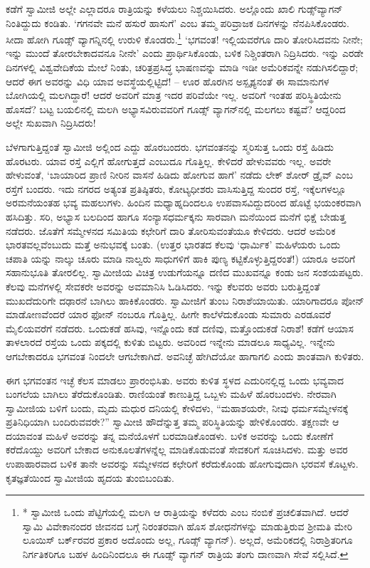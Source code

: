 ಕಡೆಗೆ ಸ್ವಾಮೀಜಿ ಅಲ್ಲೇ ಎಲ್ಲಾದರೂ ರಾತ್ರಿಯನ್ನು ಕಳೆಯಲು ನಿಶ್ಚಯಿಸಿದರು. ಅಲ್ಲೊಂದು ಖಾಲಿ ಗುಡ್ಸ್​ವ್ಯಾಗನ್ ನಿಂತಿದ್ದುದು ಕಂಡಿತು. ‘ಗಗನವೇ ಮನೆ ಹಸುರೆ ಹಾಸುಗೆ’ ಎಂಬ ತಮ್ಮ ಪರಿವ್ರಾಜಕ ದಿನಗಳನ್ನು ನೆನಪಿಸಿಕೊಂಡರು. ಸೀದಾ ಹೋಗಿ ಗೂಡ್ಸ್ ವ್ಯಾಗನ್ನಿನಲ್ಲಿ ಉರುಳಿ ಕೊಂಡರು.\footnote{* ಸ್ವಾಮೀಜಿ ಒಂದು ಪೆಟ್ಟಿಗೆಯಲ್ಲಿ ಮಲಗಿ ಆ ರಾತ್ರಿಯನ್ನು ಕಳೆದರು ಎಂಬ ನಂಬಿಕೆ ಪ್ರಚಲಿತವಾಗಿದೆ. ಆದರೆ ಸ್ವಾಮಿ ವಿವೇಕಾನಂದರ ಜೀವನದ ಬಗ್ಗೆ ನಿರಂತರವಾಗಿ ಹೊಸ ಶೋಧನೆಗಳನ್ನು ಮಾಡುತ್ತಿರುವ ಶ್ರೀಮತಿ ಮೇರಿ ಲೂಯಿಸ್ ಬರ್ಕ್​ರವರ ಪ್ರಕಾರ ಅದೊಂದು  ಅಲ್ಲ, ಗೂಡ್ಸ್ ವ್ಯಾಗನ್​). ಅಲ್ಲದೆ, ಅಮೆರಿಕದಲ್ಲಿ ನಿರಾಶ್ರಿತರಿಗೂ ನಿರ್ಗತಿಕರಿಗೂ ಬಹಳ ಹಿಂದಿನಿಂದಲೂ ಈ ಗೂಡ್ಸ್ ವ್ಯಾಗನ್ ರಾತ್ರಿಯ ತಂಗು ದಾಣವಾಗಿ ಸೇವೆ ಸಲ್ಲಿಸಿದೆ.} ‘ಭಗವಂತ! ಇಲ್ಲಿಯವರೆಗೂ ದಾರಿ ತೋರಿಸಿದವನು ನೀನೇ; ಇನ್ನು ಮುಂದೆ ತೋರಬೇಕಾದವನೂ ನೀನೇ’ ಎಂದು ಪ್ರಾರ್ಥಿಸಿಕೊಂಡು, ಬಳಿಕ ನಿಶ್ಚಿಂತರಾಗಿ ನಿದ್ರಿಸಿದರು. ಇನ್ನು ಎರಡೇ ದಿನಗಳಲ್ಲಿ ವಿಶ್ವವೇದಿಕೆಯ ಮೇಲೆ ನಿಂತು, ಚರಿತ್ರಪ್ರಸಿದ್ಧ ಭಾಷಣವನ್ನು ಮಾಡಿ ಇಡೀ ಅಮೆರಿಕವನ್ನೇ ನಡುಗಿಸಲಿದ್ದಾರೆ; ಆದರೆ ಈಗ ಅವರನ್ನು ವಿಧಿ ಯಾವ ಅವಸ್ಥೆಯಲ್ಲಿಟ್ಟಿದೆ! – ಊರ ಹೊರಗಿನ ಅಸ್ಪೃಶ್ಯನಂತೆ ಈ ಸಾಮಾನುಗಳ ಬೋಗಿಯಲ್ಲಿ ಮಲಗಿದ್ದಾರೆ! ಆದರೆ ಅವರಿಗೆ ಮಾತ್ರ ಇದರ ಪರಿವೆಯೇ ಇಲ್ಲ. ಅವರಿಗೆ ಇಂತಹ ಪರಿಸ್ಥಿತಿಯೇನು ಹೊಸದೆ? ಬಟ್ಟ ಬಯಲಿನಲ್ಲಿ ಮಲಗಿ ಅಭ್ಯಾಸವಿರುವವರಿಗೆ ಗೂಡ್ಸ್ ವ್ಯಾಗನ್​ನಲ್ಲಿ ಮಲಗಲು ಕಷ್ಟವೆ? ಆದ್ದರಿಂದ ಅಲ್ಲೇ ಸುಖವಾಗಿ ನಿದ್ರಿಸಿದರು!

ಬೆಳಗಾಗುತ್ತಿದ್ದಂತೆ ಸ್ವಾಮೀಜಿ ಅಲ್ಲಿಂದ ಎದ್ದು ಹೊರಬಂದರು. ಭಗವಂತನನ್ನು ಸ್ಮರಿಸುತ್ತ ಒಂದು ರಸ್ತೆ ಹಿಡಿದು ಹೊರಟರು. ಯಾವ ರಸ್ತೆ ಎಲ್ಲಿಗೆ ಹೋಗುತ್ತದೆ ಎಂಬುದೂ ಗೊತ್ತಿಲ್ಲ. ಕೇಳಿದರೆ ಹೇಳುವವರು ಇಲ್ಲ. ಅವರೇ ಹೇಳುವಂತೆ, ‘ಬಾಯಾರಿದ ಪ್ರಾಣಿ ನೀರಿನ ವಾಸನೆ ಹಿಡಿದು ಹೋಗುವ ಹಾಗೆ’ ನಡೆದು ಲೇಕ್ ಶೋರ್ ಡ್ರೈವ್ ಎಂಬ ರಸ್ತೆಗೆ ಬಂದರು. ಇದು ನಗರದ ಅತ್ಯಂತ ಪ್ರತಿಷ್ಠಿತರು, ಕೋಟ್ಯಧೀಶರು ವಾಸಿಸುತ್ತಿದ್ದ ಸುಂದರ ರಸ್ತೆ, ಇಕ್ಕೆಲಗಳಲ್ಲೂ ಅರಮನೆಯಂತಹ ಭವ್ಯ ಮಹಲುಗಳು. ಹಿಂದಿನ ಮಧ್ಯಾಹ್ನದಿಂದಲೂ ಉಪವಾಸವಿದ್ದುದರಿಂದ ಹೊಟ್ಟೆ ಭಯಂಕರವಾಗಿ ಹಸಿದಿತ್ತು. ಸರಿ, ಅಭ್ಯಾಸ ಬಲದಿಂದ ಹಾಗೂ ಸಂನ್ಯಾಸಧರ್ಮಕ್ಕನು ಸಾರವಾಗಿ ಮನೆಯಿಂದ ಮನೆಗೆ ಭಿಕ್ಷೆ ಬೇಡುತ್ತ ನಡೆದರು. ಜೊತೆಗೆ ಸಮ್ಮೇಳನದ ಸಮಿತಿಯ ಕಛೇರಿಗೆ ದಾರಿ ತೋರಿಸುವಂತೆಯೂ ಕೇಳಿದರು. ಆದರೆ ಅಮೆರಿಕ ಭಾರತವಲ್ಲವೆಂಬುದು ಮತ್ತೆ ಅನುಭವಕ್ಕೆ ಬಂತು. (ಉತ್ತರ ಭಾರತದ ಕೆಲವು ‘ಧಾರ್ಮಿಕ’ ಮಹಿಳೆಯರು ಒಂದು ಚಪಾತಿ ಯನ್ನು ನಾಲ್ಕು ಚೂರು ಮಾಡಿ ನಾಲ್ವರು ಸಾಧುಗಳಿಗೆ ಹಾಕಿ ಪುಣ್ಯ ಕಟ್ಟಿಕೊಳ್ಳುತ್ತಿದ್ದರಂತೆ!) ಯಾರೂ ಅವರಿಗೆ ಸಹಾನುಭೂತಿ ತೋರಲಿಲ್ಲ. ಸ್ವಾಮೀಜಿಯ ವಿಚಿತ್ರ ಉಡುಗೆಯನ್ನೂ ದಣಿದ ಮುಖವನ್ನೂ ಕಂಡು ಜನ ಸಂಶಯಪಟ್ಟರು. ಕೆಲವು ಮನೆಗಳಲ್ಲಿ ಸೇವಕರೇ ಅವರನ್ನು ಅವಮಾನಿಸಿ ಓಡಿಸಿದರು. ಇನ್ನು ಕೆಲವರು ಅವರು ಬರುತ್ತಿದ್ದಂತೆ ಮುಖದೆದುರಿಗೇ ದಢಾರನೆ ಬಾಗಿಲು ಹಾಕಿಕೊಂಡರು. ಸ್ವಾಮೀಜಿಗೆ ತುಂಬ ನಿರಾಶೆಯಾಯಿತು. ಯಾರಿಗಾದರೂ ಪೋನ್ ಮಾಡೋಣವೆಂದರೆ ಯಾರ ಫೋನ್ ನಂಬರೂ ಗೊತ್ತಿಲ್ಲ. ಹೀಗೇ ಕಾಲೆಳೆದುಕೊಂಡು ಸುಮಾರು ಎರಡೂವರೆ ಮೈಲಿಯವರೆಗೆ ನಡೆದರು. ಒಂದುಕಡೆ ಹಸಿವು, ಇನ್ನೊಂದು ಕಡೆ ದಣಿವು, ಮತ್ತೊಂದುಕಡೆ ನಿರಾಶೆ! ಕಡೆಗೆ ಆಯಾಸ ತಾಳಲಾರದೆ ರಸ್ತೆಯ ಒಂದು ಪಕ್ಕದಲ್ಲಿ ಕುಳಿತು ಬಿಟ್ಟರು. ಅವರಿಂದ ಇನ್ನೇನು ಮಾಡಲೂ ಸಾಧ್ಯವಿಲ್ಲ. ಇನ್ನೇನು ಆಗಬೇಕಾದರೂ ಭಗವಂತ ನಿಂದಲೇ ಆಗಬೇಕಾಗಿದೆ. ಅವನಿಚ್ಛೆ ಹೇಗಿದೆಯೋ ಹಾಗಾಗಲಿ ಎಂದು ಶಾಂತವಾಗಿ ಕುಳಿತರು.

ಈಗ ಭಗವಂತನ ಇಚ್ಛೆ ಕೆಲಸ ಮಾಡಲು ಪ್ರಾರಂಭಿಸಿತು. ಅವರು ಕುಳಿತ ಸ್ಥಳದ ಎದುರಿನಲ್ಲಿದ್ದ ಒಂದು ಭವ್ಯವಾದ ಬಂಗಲೆಯ ಬಾಗಿಲು ತೆರೆದುಕೊಂಡಿತು. ರಾಣಿಯಂತೆ ಕಾಣುತ್ತಿದ್ದ ಒಬ್ಬಳು ಮಹಿಳೆ ಹೊರಬಂದಳು. ನೇರವಾಗಿ ಸ್ವಾಮೀಜಿಯ ಬಳಿಗೆ ಬಂದು, ಮೃದು ಮಧುರ ದನಿಯಲ್ಲಿ ಕೇಳಿದಳು, “ಮಹಾಶಯರೇ, ನೀವು ಧರ್ಮಸಮ್ಮೇಳನಕ್ಕೆ ಪ್ರತಿನಿಧಿಯಾಗಿ ಬಂದಿರುವವರೇ?” ಸ್ವಾಮೀಜಿ ಹೌದೆನ್ನುತ್ತ ತಮ್ಮ ಪರಿಸ್ಥಿತಿಯನ್ನು ಹೇಳಿಕೊಂಡರು. ತಕ್ಷಣವೇ ಆ ದಯಾವಂತ ಮಹಿಳೆ ಅವರನ್ನು ತನ್ನ ಮನೆಯೊಳಗೆ ಬರಮಾಡಿಕೊಂಡಳು. ಬಳಿಕ ಅವರನ್ನು ಒಂದು ಕೋಣೆಗೆ ಕರೆದೊಯ್ದು ಅವರಿಗೆ ಬೇಕಾದ ಅನುಕೂಲತೆಗಳನ್ನೆಲ್ಲ ಮಾಡಿಕೊಡುವಂತೆ ಸೇವಕರಿಗೆ ಸೂಚಿಸಿದಳು. ಮತ್ತು ಅವರ ಉಪಾಹಾರವಾದ ಬಳಿಕ ತಾನೇ ಅವರನ್ನು ಸಮ್ಮೇಳನದ ಕಛೇರಿಗೆ ಕರೆದುಕೊಂಡು ಹೋಗುವುದಾಗಿ ಭರವಸೆ ಕೊಟ್ಟಳು. ಕೃತಜ್ಞತೆಯಿಂದ ಸ್ವಾಮೀಜಿಯ ಹೃದಯ ತುಂಬಿಬಂದಿತು.

